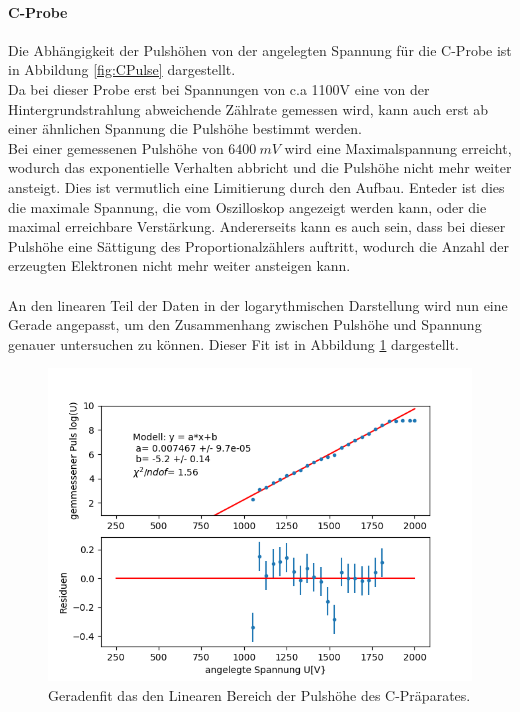\documentclass[12pt,a4paper]{article}
\begin{document}
\paragraph{C-Probe}
Die Abhängigkeit der Pulshöhen von der angelegten Spannung für die C-Probe ist in Abbildung \ref{fig:CPulse} dargestellt.\\
Da bei dieser Probe erst bei Spannungen von c.a 1100V eine von der Hintergrundstrahlung abweichende Zählrate gemessen wird, kann auch erst ab einer ähnlichen Spannung die Pulshöhe bestimmt werden.\\
Bei einer gemessenen Pulshöhe von $\SI{6400}{mV}$ wird eine Maximalspannung erreicht, wodurch das exponentielle Verhalten abbricht und die Pulshöhe nicht mehr weiter ansteigt. Dies ist vermutlich eine Limitierung durch den Aufbau. Enteder ist dies die maximale Spannung, die vom Oszilloskop angezeigt werden kann, oder die maximal erreichbare Verstärkung. Andererseits kann es auch sein, dass bei dieser Pulshöhe eine Sättigung des Proportionalzählers auftritt, wodurch die Anzahl der erzeugten Elektronen nicht mehr weiter ansteigen kann.\\
\\
An den linearen Teil der Daten in der logarythmischen Darstellung wird nun eine Gerade angepasst, um den Zusammenhang zwischen Pulshöhe und Spannung genauer untersuchen zu können. Dieser Fit ist in Abbildung \ref{fig:CPulsfit} dargestellt.\\

\begin{figure}
\centering
\includegraphics[scale=0.8]{Bilder/Prop/C_Pulsfit.PNG}
\caption{Geradenfit das den Linearen Bereich der Pulshöhe des C-Präparates.}
\label{fig:CPulsfit}
\end{figure}
\end{document}
